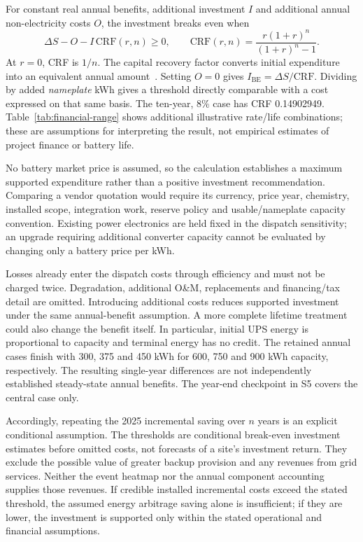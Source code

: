 For constant real annual benefits, additional investment $I$ and additional annual non-electricity costs $O$, \textcolor{LatestGreen}{the investment breaks even when}
\begin{equation}
\Delta S-O-I\,\mathrm{CRF}(r,n)\geq0,\qquad
\mathrm{CRF}(r,n)=\frac{r(1+r)^n}{(1+r)^n-1}.
\end{equation}
At $r=0$, CRF is $1/n$. The capital recovery factor converts initial expenditure into an equivalent annual amount~\cite{sam_crf}. Setting $O=0$ gives $I_{\mathrm{BE}}=\Delta S/\mathrm{CRF}$. Dividing by added \emph{nameplate} kWh gives a threshold directly comparable with a cost expressed on that same basis. The ten-year, 8\% case has CRF 0.14902949. Table~\ref{tab:financial-range} shows additional illustrative rate/life combinations; these are assumptions for interpreting the result, not empirical estimates of project finance or battery life.



No battery market price is assumed, so the calculation establishes a maximum supported expenditure rather than a positive investment recommendation. Comparing a vendor quotation would require its currency, price year, chemistry, installed scope, integration work, reserve policy and usable/nameplate capacity convention. Existing power electronics are held fixed in the dispatch sensitivity; an upgrade requiring additional converter capacity cannot be evaluated by changing only a battery price per kWh.

Losses already enter the dispatch costs through efficiency and must not be charged twice. Degradation, additional O\&M, replacements and financing/tax detail are omitted. Introducing additional costs reduces supported investment under the same annual-benefit assumption. A more complete lifetime treatment could also change the benefit itself. In particular, initial UPS energy is proportional to capacity and terminal energy has no credit. The retained annual cases finish with 300, 375 and 450 kWh for 600, 750 and 900 kWh capacity, respectively. The resulting single-year differences are not independently established steady-state annual benefits. The year-end checkpoint in S5 covers the central case only.

Accordingly, repeating the 2025 incremental saving over $n$ years is an explicit conditional assumption. \textcolor{LatestGreen}{The thresholds are conditional break-even investment estimates before omitted costs, not forecasts of a site's investment return.} They exclude the possible value of greater backup provision and any revenues from grid services. Neither the event heatmap nor the annual component accounting supplies those revenues. If credible installed incremental costs exceed the stated threshold, the assumed \textcolor{LatestGreen}{energy arbitrage} saving alone is insufficient; if they are lower, \textcolor{LatestGreen}{the investment is supported only within the stated operational and financial assumptions.}
